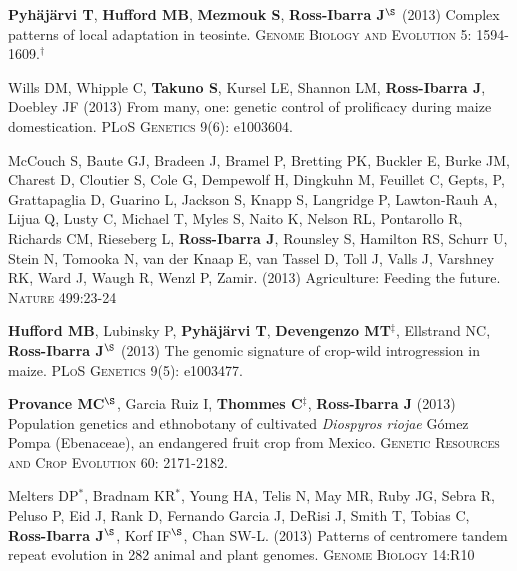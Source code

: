 \documentclass[letterpaper]{article}
\begin{document}
\begin{etaremune}
\vspace{-2ex}
\item {\bf Pyh\"aj\"arvi T}, {\bf Hufford MB}, {\bf Mezmouk S}, {\bf Ross-Ibarra J}$^\S$ (2013) Complex patterns of local adaptation in teosinte. \textsc{Genome Biology and Evolution} 5: 1594-1609.$^\dagger$

\vspace{-2ex}
\item Wills DM, Whipple C, {\bf Takuno S}, Kursel LE, Shannon LM, {\bf Ross-Ibarra J}, Doebley JF (2013) From many, one: genetic control of prolificacy during maize domestication. \textsc{PLoS Genetics} 9(6): e1003604. %

\vspace{-2ex}
\item McCouch S, Baute GJ, Bradeen J, Bramel P, Bretting PK, Buckler E, Burke JM, Charest D, Cloutier S, Cole G, Dempewolf H, Dingkuhn M, Feuillet C, Gepts, P, Grattapaglia D, Guarino L, Jackson S, Knapp S, Langridge P, Lawton-Rauh A, Lijua Q, Lusty C, Michael T, Myles S, Naito K, Nelson RL, Pontarollo R, Richards CM, Rieseberg L, {\bf Ross-Ibarra J}, Rounsley S, Hamilton RS, Schurr U, Stein N, Tomooka N, van der Knaap E, van Tassel D, Toll J, Valls J, Varshney RK, Ward J, Waugh R, Wenzl P, Zamir. (2013) Agriculture: Feeding the future. \textsc{Nature} 499:23-24

\vspace{-2ex}
\item {\bf Hufford MB}, Lubinsky P, {\bf Pyh\"aj\"arvi T}, {\bf Devengenzo MT}$^\ddagger$, Ellstrand NC, {\bf Ross-Ibarra J}$^\S$ (2013) The genomic signature of crop-wild introgression in maize. \textsc{PLoS Genetics} 9(5): e1003477. %

\vspace{-2ex}
\item {\bf Provance MC}$^\S$, Garcia Ruiz I, {\bf Thommes C}$^\ddagger$, {\bf Ross-Ibarra J} (2013) Population genetics and ethnobotany of cultivated \emph{Diospyros riojae} G\'omez Pompa (Ebenaceae), an endangered fruit crop from Mexico. \textsc{Genetic Resources and Crop Evolution} 60: 2171-2182.

\vspace{-2ex}
\item Melters DP$^*$, Bradnam KR$^*$, Young HA, Telis N, May MR, Ruby JG, Sebra R, Peluso P, Eid J, Rank D, Fernando Garcia J, DeRisi J, Smith T, Tobias C, {\bf Ross-Ibarra J}$^\S$, Korf IF$^\S$, Chan SW-L. (2013) Patterns of centromere tandem repeat evolution in 282 animal and plant genomes. \textsc{Genome Biology} 14:R10 


\end{etaremune}
\end{document}
